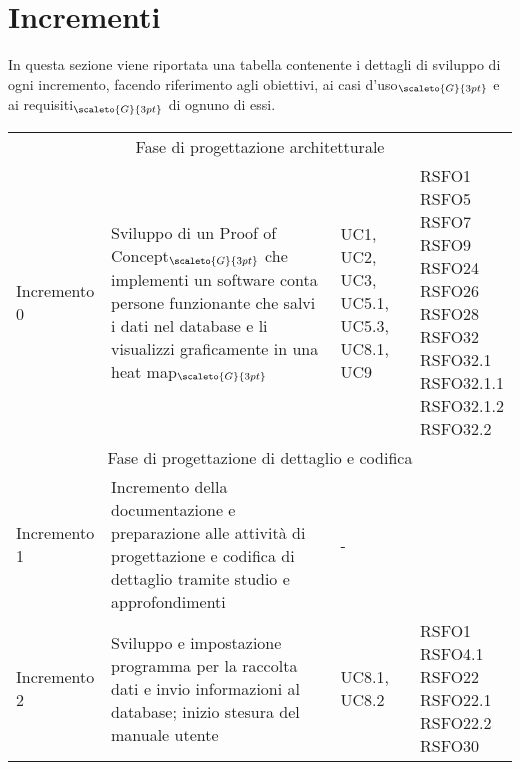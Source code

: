 \section{Incrementi}\label{ModelloDiSviluppoIncrementi}
In questa sezione viene riportata una tabella contenente i dettagli di sviluppo di ogni incremento, facendo riferimento agli obiettivi, ai casi d'uso$_{\scaleto{G}{3pt}}$ e ai requisiti$_{\scaleto{G}{3pt}}$ di ognuno di essi.
\begin{center}
	\renewcommand{\arraystretch}{1.4}
	\begin{longtable}[c]{p{3cm}|p{5cm}|p{4cm}|p{3cm}}
		\hline
		\rowcolor{airforceblue}
		\makecell[c]{\textbf{Incremento}} & \makecell[c]{\textbf{Obiettivi}} & \makecell[c]{\textbf{Casi d'uso}} &  \makecell[c]{\textbf{Requisiti}}\\
		\hline
		\multicolumn{4}{|c|}{Fase di progettazione architetturale}\\
		\hline
		\centering Incremento 0 & \centering Sviluppo di un
		Proof of Concept$_{\scaleto{G}{3pt}}$ che implementi un software conta persone funzionante che salvi i dati nel database e li visualizzi graficamente in una heat map$_{\scaleto{G}{3pt}}$ & \centering  UC1, UC2, UC3, UC5.1, UC5.3, UC8.1, UC9 & \makecell[tc]{RSFO1 \\ RSFO5 \\ RSFO7 \\ RSFO9 \\ RSFO24 \\ RSFO26 \\ RSFO28 \\ RSFO32 \\ RSFO32.1 \\ RSFO32.1.1 \\ RSFO32.1.2 \\ RSFO32.2} \\
		\hline
		\multicolumn{4}{|c|}{Fase di progettazione di dettaglio e codifica}\\
		\hline
		\centering Incremento 1 & \centering Incremento della documentazione e preparazione alle attività di progettazione e codifica di dettaglio tramite studio e approfondimenti & \centering - & \makecell[tc]{-} \\
		\hline
		\centering Incremento 2 & \centering Sviluppo e impostazione programma per la raccolta dati e invio informazioni al database; inizio stesura del manuale utente & \centering UC8.1, UC8.2 & \makecell[tc]{RSFO1 \\ RSFO4.1 \\ RSFO22 \\ RSFO22.1 \\ RSFO22.2 \\ RSFO30} \\

\end{longtable}
\end{center}
